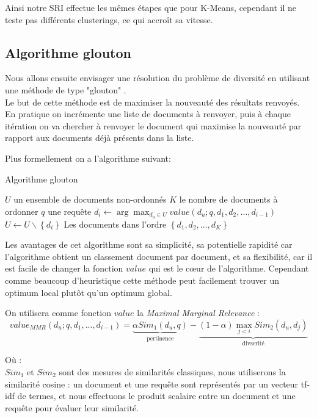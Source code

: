 \documentclass{article}
\begin{document}
Ainsi notre SRI effectue les mêmes étapes que pour K-Means, cependant il ne teste pas différents clusterings, ce qui accroît sa vitesse.


\subsection{Algorithme glouton} Nous allons ensuite envisager une résolution du problème de diversité en utilisant une méthode de type "glouton" \cite{zhai03}. \\

Le but de cette méthode est de maximiser la nouveauté des résultats renvoyés. En pratique on incrémente une liste de documents à renvoyer, puis à chaque itération on va chercher à renvoyer le document qui maximise la nouveauté par rapport aux documents déjà présents dans la liste.

Plus formellement on a l'algorithme suivant:

\begin{algorithm}
\caption{Algorithme glouton}
\begin{algorithmic}
\REQUIRE $U$ un ensemble de documents non-ordonnés
\REQUIRE $K$ le nombre de documents à ordonner
\REQUIRE $q$ une requête
\STATE $d_i \leftarrow \arg\max_{d_u \in U} value(d_u;q, d_1,d_2,\dots,d_{i-1})$ 
\STATE $U \leftarrow U \backslash \left\{d_i\right\}$
\ENDFOR
\RETURN Les documents dans l'ordre $\left\{d_1, d_2,\dots, d_K\right\}$
\end{algorithmic}
\end{algorithm}

Les avantages de cet algorithme sont sa simplicité, sa potentielle rapidité car l'algorithme obtient un classement document par document, et sa flexibilité, car il est facile de changer la fonction $value$ qui est le cœur de l'algorithme. Cependant comme beaucoup d'heuristique cette méthode peut facilement trouver un optimum local plutôt qu'un optimum global.


On utilisera comme fonction $value$ la \textit{Maximal Marginal Relevance} : 
$$value_{MMR}(d_u;q,d_1,...,d_{i-1}) = \underbrace{\alpha Sim_{1}(d_u,q)}_{\text{pertinence}} - \underbrace{(1-\alpha)\max\limits_{j < i} Sim_{2}(d_u, d_j)}_{\text{divserité}}$$

Où :\\
$Sim_{1}$ et $Sim_{2}$ sont des mesures de similarités classiques, nous utiliserons la similarité cosine : un document et une requête sont représentés par un vecteur tf-idf de termes, et nous effectuons le produit scalaire entre un document et une requête pour évaluer leur similarité.
\end{document}
